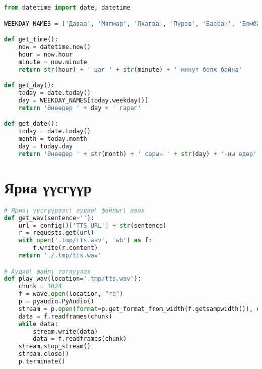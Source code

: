 \begin{lstlisting}[language=Python]
from datetime import date, datetime

WEEKDAY_NAMES = ['Даваа', 'Мягмар', 'Лхагва', 'Пүрэв', 'Баасан', 'Бямба', 'Ням']

def get_time():
    now = datetime.now()
    hour = now.hour
    minute = now.minute
    return str(hour) + ' цаг ' + str(minute) + ' минут болж байна'

def get_day():
    today = date.today()
    day = WEEKDAY_NAMES[today.weekday()]
    return 'Өнөөдөр ' + day + ' гараг'

def get_date():
    today = date.today()
    month = today.month
    day = today.day
    return 'Өнөөдөр ' + str(month) + ' сарын ' + str(day) + '-ны өдөр'
\end{lstlisting}

\chapter{Яриа үүсгүүр}
\label{appendix:tts}
\begin{lstlisting}[language=Python]
# Яриа\ үүсгүүрээс\ аудио\ файлыг\ авах
def get_wav(sentence=''):
    url = config()['TTS_URL'] + str(sentence)
    r = requests.get(url)
    with open('.tmp/tts.wav', 'wb') as f:
        f.write(r.content)
    return './.tmp/tts.wav'

# Аудио\ файл\ тоглуулах
def play_wav(location='.tmp/tts.wav'):
    chunk = 1024
    f = wave.open(location, "rb")
    p = pyaudio.PyAudio()
    stream = p.open(format=p.get_format_from_width(f.getsampwidth()), channels=f.getnchannels(), rate=f.getframerate(), output=True)
    data = f.readframes(chunk)
    while data:
        stream.write(data)
        data = f.readframes(chunk)
    stream.stop_stream()
    stream.close()
    p.terminate()
    \end{lstlisting}